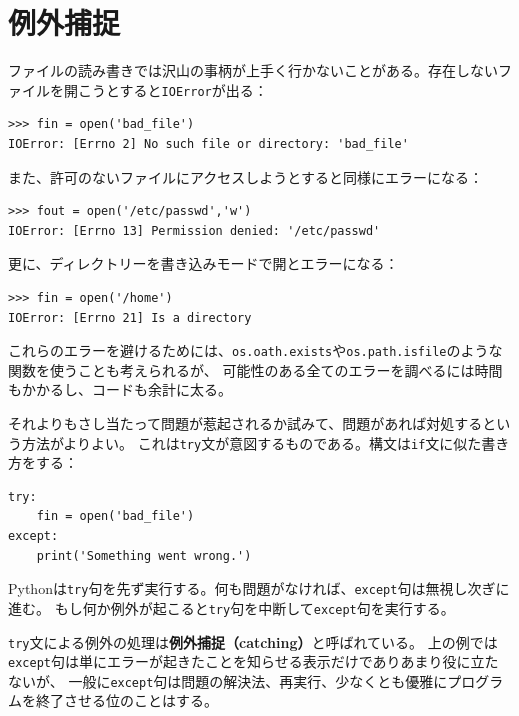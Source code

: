 \documentclass[a4j,12pt,makeidx]{jbook}
\begin{document}
\section{例外捕捉}
ファイルの読み書きでは沢山の事柄が上手く行かないことがある。存在しないファイルを開こうとすると{\tt IOError}が出る：
\begin{verbatim}
>>> fin = open('bad_file')
IOError: [Errno 2] No such file or directory: 'bad_file'
\end{verbatim} 
また、許可のないファイルにアクセスしようとすると同様にエラーになる：
\begin{verbatim}
>>> fout = open('/etc/passwd','w')
IOError: [Errno 13] Permission denied: '/etc/passwd'
\end{verbatim} 
更に、ディレクトリーを書き込みモードで開とエラーになる：
\begin{verbatim}
>>> fin = open('/home')
IOError: [Errno 21] Is a directory
\end{verbatim} 
これらのエラーを避けるためには、{\tt os.oath.exists}や{\tt os.path.isfile}のような関数を使うことも考えられるが、
可能性のある全てのエラーを調べるには時間もかかるし、コードも余計に太る。\par
それよりもさし当たって問題が惹起されるか試みて、問題があれば対処するという方法がよりよい。
これは{\tt try}文が意図するものである。構文は{\tt if}文に似た書き方をする：
\begin{verbatim}
try:    
    fin = open('bad_file')
except:
    print('Something went wrong.')
\end{verbatim}
Pythonは{\tt try}句を先ず実行する。何も問題がなければ、{\tt except}句は無視し次ぎに進む。
もし何か例外が起こると{\tt try}句を中断して{\tt except}句を実行する。\par
{\tt try}文による例外の処理は{\bf 例外捕捉（catching）}と呼ばれている。
上の例では{\tt except}句は単にエラーが起きたことを知らせる表示だけでありあまり役に立たないが、
一般に{\tt except}句は問題の解決法、再実行、少なくとも優雅にプログラムを終了させる位のことはする。\\
%
\end{document}
